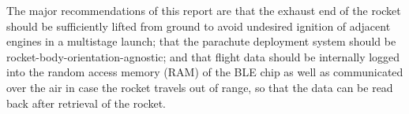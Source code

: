 \documentclass{workreport}
\begin{document}
\begin{frontmatter}
\begin{summary}
	The major recommendations of this report are that the exhaust end of the rocket should be sufficiently lifted from ground to avoid undesired ignition of adjacent engines in a multistage launch; that the parachute deployment system should be rocket-body-orientation-agnostic; and that flight data should be internally logged into the random access memory (RAM) of the BLE chip as well as communicated over the air in case the rocket travels out of range, so that the data can be read back after retrieval of the rocket.


\end{summary}

\begin{conclusions}



\end{conclusions}

\begin{recommendations}

        \lipsum[1-3]

\end{recommendations}

\toctree

\listoffiguresandtables

\end{frontmatter}

\end{document}
